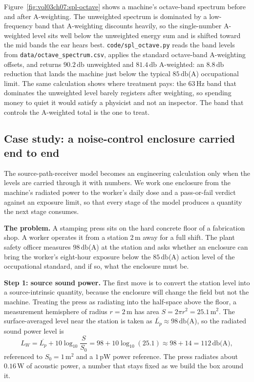 

Figure~\ref{fig:vol03ch07:spl-octave} shows a machine's octave-band
spectrum before and after A-weighting. The unweighted spectrum is
dominated by a low-frequency band that A-weighting discounts heavily,
so the single-number A-weighted level sits well below the unweighted
energy sum and is shifted toward the mid bands the ear hears best.
\texttt{code/spl\_octave.py} reads the band levels from
\texttt{data/octave\_spectrum.csv}, applies the standard octave-band
A-weighting offsets, and returns $90.2\,\si{\decibel}$ unweighted and
$81.4\,\si{\decibel}$ A-weighted: an $8.8\,\si{\decibel}$ reduction
that lands the machine just below the typical $85\,\si{\decibel}$(A)
occupational limit. The same calculation shows where treatment pays:
the $63\,\si{\hertz}$ band that dominates the unweighted level barely
registers after weighting, so spending money to quiet it would satisfy
a physicist and not an inspector. The band that controls the
A-weighted total is the one to treat.

\subsection{Case study: a noise-control enclosure carried end to end}

The source-path-receiver model becomes an engineering calculation only
when the levels are carried through it with numbers. We work one
enclosure from the machine's radiated power to the worker's daily dose
and a pass-or-fail verdict against an exposure limit, so that every
stage of the model produces a quantity the next stage consumes.

\textbf{The problem.} A stamping press sits on the hard concrete floor
of a fabrication shop. A worker operates it from a station
$2\,\si{\meter}$ away for a full shift. The plant safety officer
measures $98\,\si{\decibel}$(A) at the station and asks whether an
enclosure can bring the worker's eight-hour exposure below the
$85\,\si{\decibel}$(A) action level of the occupational standard, and
if so, what the enclosure must be.

\textbf{Step 1: source sound power.} The first move is to convert the
station level into a source-intrinsic quantity, because the enclosure
will change the field but not the machine. Treating the press as
radiating into the half-space above the floor, a measurement hemisphere
of radius $r=2\,\si{\meter}$ has area $S=2\pi r^2 = 25.1\,\si{
\meter\squared}$. The surface-averaged level near the station is taken
as $\overline{L_p}\approx 98\,\si{\decibel}$(A), so the radiated sound
power level is
\[
L_W = \overline{L_p} + 10\log_{10}\frac{S}{S_0}
    = 98 + 10\log_{10}(25.1) \approx 98 + 14 = 112\,\si{\decibel}\text{(A)},
\]
referenced to $S_0=1\,\si{\meter\squared}$ and a $1\,\si{\pico\watt}$
power reference. The press radiates about $0.16\,\si{\watt}$ of acoustic
power, a number that stays fixed as we build the box around it.

